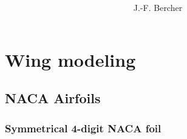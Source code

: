 \documentclass[11pt]{article}
\title{ }
\author{J.-F. Bercher}
\begin{document}
    
    
    \maketitle
    
\tableofcontents

    


    
    \hypertarget{wing-modeling}{%
\section{Wing modeling}\label{wing-modeling}}

    \hypertarget{naca-airfoils}{%
\subsection{NACA Airfoils}\label{naca-airfoils}}

    \hypertarget{symmetrical-4-digit-naca-foil}{%
\subsubsection{Symmetrical 4-digit NACA
foil}\label{symmetrical-4-digit-naca-foil}}
\end{document}
